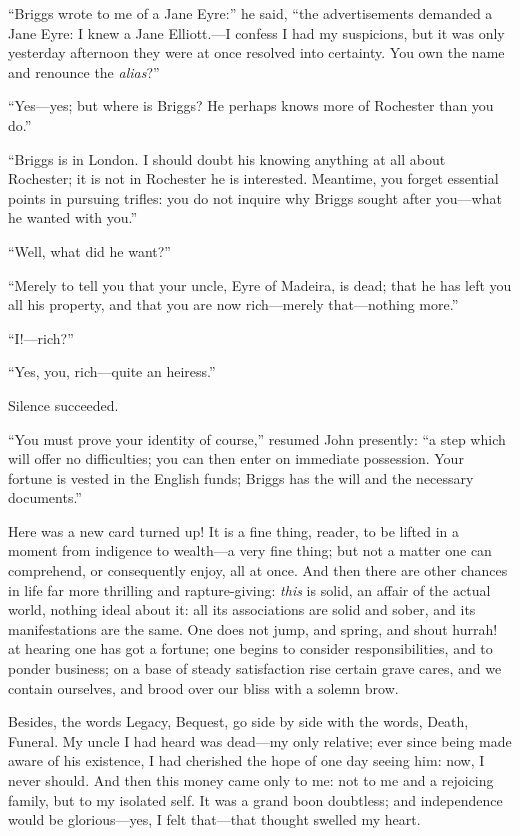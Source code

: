 \enquote{Briggs wrote to me of a Jane Eyre:} he said, \enquote{the
advertisements demanded a Jane Eyre: I knew a Jane Elliott.---I confess
I had my suspicions, but it was only yesterday afternoon they were at
once resolved into certainty. You own the name and renounce the
\emph{alias}?}

\enquote{Yes---yes; but where is \Mr{} Briggs? He perhaps knows more of
\Mr{} Rochester than you do.}

\enquote{Briggs is in London. I should doubt his knowing anything at
all about \Mr{} Rochester; it is not in \Mr{} Rochester he is interested. 
Meantime, you forget essential points in pursuing trifles: you do not
inquire why \Mr{} Briggs sought after you---what he wanted with you.}

\enquote{Well, what did he want?}

\enquote{Merely to tell you that your uncle, \Mr{} Eyre of Madeira, is
dead; that he has left you all his property, and that you are now
rich---merely that---nothing more.}

\enquote{I!---rich?}

\enquote{Yes, you, rich---quite an heiress.}

Silence succeeded.

\enquote{You must prove your identity of course,} resumed \St{} John
presently: \enquote{a step which will offer no difficulties; you can
then enter on immediate possession. Your fortune is vested in the
English funds; Briggs has the will and the necessary documents.}

Here was a new card turned up! It is a fine thing, reader, to be lifted
in a moment from indigence to wealth---a very fine thing; but not a
matter one can comprehend, or consequently enjoy, all at once. And then
there are other chances in life far more thrilling and rapture-giving:
\emph{this} is solid, an affair of the actual world, nothing ideal about
it: all its associations are solid and sober, and its manifestations are
the same. One does not jump, and spring, and shout hurrah! at hearing
one has got a fortune; one begins to consider responsibilities, and to
ponder business; on a base of steady satisfaction rise certain grave
cares, and we contain ourselves, and brood over our bliss with a solemn
brow.

Besides, the words Legacy, Bequest, go side by side with the words,
Death, Funeral. My uncle I had heard was dead---my only relative; ever
since being made aware of his existence, I had cherished the hope of one
day seeing him: now, I never should. And then this money came only to
me: not to me and a rejoicing family, but to my isolated self. It was a
grand boon doubtless; and independence would be glorious---yes, I felt
that---that thought swelled my heart.

